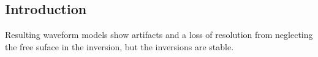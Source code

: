 \renewcommand{\pmk}{Bleibinhaus\_2009\_Geophy\_Surface scattering in FWI}
\renewcommand{\prf}{FWI/\pmk.pdf}
\renewcommand{\pti}{Effects of surface scattering in full-waveform inversion}
\renewcommand{\pay}{Florian Bleibinhaus and St\'ephance Rondenay, 2009}
\renewcommand{\pjo}{Geophysics}
\renewcommand{\pda}{2019/5/6 Mon.}

\section{\pinfo}
\subsection{Introduction}
Resulting waveform models show artifacts and a loss of resolution
from neglecting the free suface in the inversion,
but the inversions are stable.

